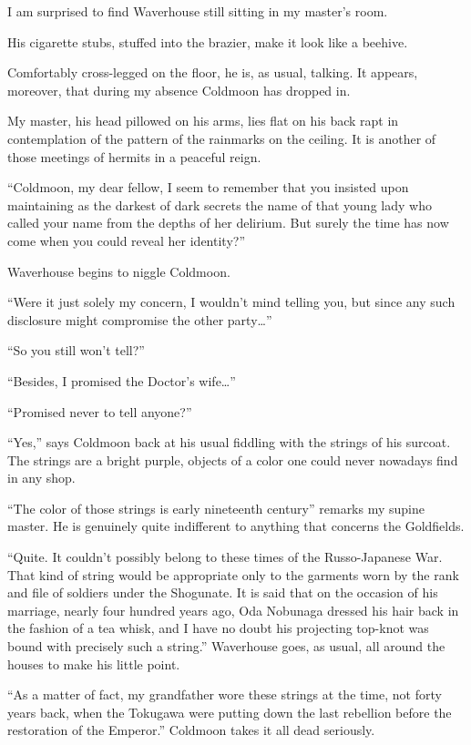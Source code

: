 \documentclass[12pt, openright]{book}
\begin{document}
I am surprised to find Waverhouse still sitting in my master's room.

His cigarette stubs, stuffed into the brazier, make it look like a
beehive.

Comfortably cross-legged on the floor, he is, as usual, talking. It
appears, moreover, that during my absence Coldmoon has dropped in.

My master, his head pillowed on his arms, lies flat on his back rapt in
contemplation of the pattern of the rainmarks on the ceiling. It is
another of those meetings of hermits in a peaceful reign.

``Coldmoon, my dear fellow, I seem to remember that you insisted upon
maintaining as the darkest of dark secrets the name of that young lady
who called your name from the depths of her delirium. But surely the
time has now come when you could reveal her identity?''

Waverhouse begins to niggle Coldmoon.

``Were it just solely my concern, I wouldn't mind telling you, but since
any such disclosure might compromise the other party\ldots{}''

``So you still won't tell?''

``Besides, I promised the Doctor's wife\ldots{}''

``Promised never to tell anyone?''

``Yes,'' says Coldmoon back at his usual fiddling with the strings of
his surcoat. The strings are a bright purple, objects of a color one
could never nowadays find in any shop.

``The color of those strings is early nineteenth century'' remarks my
supine master. He is genuinely quite indifferent to anything that
concerns the Goldfields.

``Quite. It couldn't possibly belong to these times of the
Russo-Japanese War. That kind of string would be appropriate only to the
garments worn by the rank and file of soldiers under the Shogunate. It
is said that on the occasion of his marriage, nearly four hundred years
ago, Oda Nobunaga dressed his hair back in the fashion of a tea whisk,
and I have no doubt his projecting top-knot was bound with precisely
such a string.'' Waverhouse goes, as usual, all around the houses to
make his little point.

``As a matter of fact, my grandfather wore these strings at the time,
not forty years back, when the Tokugawa were putting down the last
rebellion before the restoration of the Emperor.'' Coldmoon takes it all
dead seriously.
\end{document}
